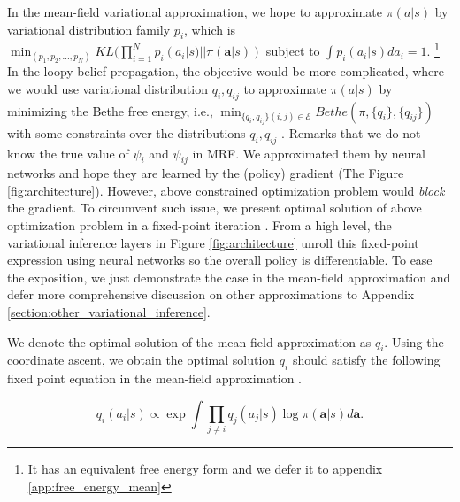 \documentclass[11pt,a4paper]{article}
\theoremstyle{definition}
\begin{document}
In the mean-field variational approximation, we hope to approximate  $\pi(a|s)$ by variational distribution family $p_i$, which is $\min_{(p_1,p_2,...,p_N)} KL (\prod_{i=1}^{N} p_i(a_i|s)|| \pi(\mathbf{a}|s))$ subject to $\int p_i(a_i|s)da_i =1$.  \footnote{It has an equivalent free energy form and we defer it to appendix \ref{app:free_energy_mean}} In the loopy belief propagation, the objective  would be more complicated, where we would use variational distribution $q_i,q_{ij}$ to approximate $\pi(a|s)$ by minimizing the Bethe free energy, i.e., $\min_{\{q_i,q_{ij}\}{(i,j)\in \mathcal{E}}} Bethe(\pi,\{q_i\},\{q_{ij}\})$ with some constraints over the distributions $q_i,q_{ij}$ \citep{yedidia2001bethe}. Remarks that we do not know  the true value of $\psi_i$ and $\psi_{ij}$ in MRF.  We approximated them by neural networks and hope they are learned by the (policy) gradient (The Figure \ref{fig:architecture}). However,  above constrained optimization problem  would \emph{block} the gradient. To circumvent such issue, we present optimal solution of above optimization problem in a fixed-point iteration \cite{blei2016variational}. From a high level, the variational inference layers in Figure \ref{fig:architecture} unroll this fixed-point expression using neural networks so the overall policy is differentiable.  To ease the exposition, we just demonstrate the case in the mean-field approximation and defer more comprehensive discussion on other approximations to Appendix \ref{section:other_variational_inference}.

We denote the optimal solution of the mean-field approximation as $q_i$. Using the coordinate ascent, we obtain the optimal solution $q_i$ should satisfy the following fixed point equation in the mean-field approximation \citep{bishop2006pattern}.

\begin{equation}\label{equ:mean_field_solution}
q_i(a_i|s) \propto \exp \int \prod_{j\neq i} q_j(a_j|s) \log \pi(\mathbf{a}|s)d\mathbf{a}. 
\end{equation}



\end{document}
